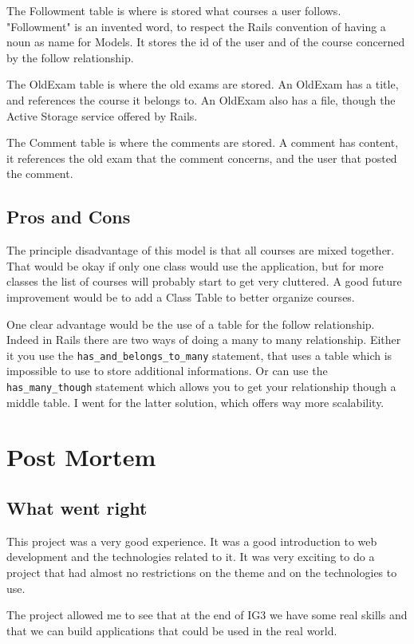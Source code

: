 \documentclass[12pt,a4paper]{article}
\begin{document}
The Followment table is where is stored what courses a user follows.
"Followment" is an invented word, to respect the Rails convention of having a
noun as name for Models. It stores the id of the user and of the course
concerned by the follow relationship.

The OldExam table is where the old exams are stored. An OldExam has a title,
and references the course it belongs to. An OldExam also has a file, though the
Active Storage service offered by Rails.

The Comment table is where the comments are stored. A comment has content, it
references the old exam that the comment concerns, and the user that posted the
comment.

\subsection{Pros and Cons}


The principle disadvantage of this model is that all courses are mixed
together. That would be okay if only one class would use the application, but
for more classes the list of courses will probably start to get very cluttered.
A good future improvement would be to add a Class Table to better organize
courses.

One clear advantage would be the use of a table for the follow relationship.
Indeed in Rails there are two ways of doing a many to many relationship. Either
it you use the \lstinline{has_and_belongs_to_many} statement, that uses a table
which is impossible to use to store additional informations. Or can use the
\lstinline{has_many_though} statement which allows you to get your relationship
though a middle table. I went for the latter solution, which offers way more
scalability.


\section{Post Mortem}


\subsection{What went right}

This project was a very good experience. It was a good introduction to web
development and the technologies related to it. It was very exciting to do a
project that had almost no restrictions on the theme and on the technologies to
use.

The project allowed me to see that at the end of IG3 we have some real skills
and that we can build applications that could be used in the real world.
\end{document}
